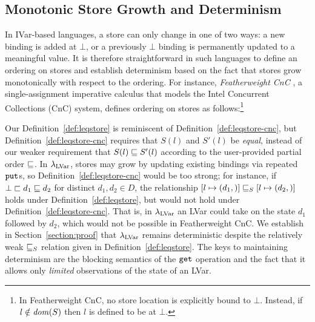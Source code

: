 
\subsection{Monotonic Store Growth and Determinism}\label{subsection:monotonicity}

In IVar-based languages, a store can only change
in one of two ways: a new binding is added at $\bot$, or a
previously $\bot$ binding is permanently updated to a meaningful value.
It is therefore straightforward in such languages
to define an ordering on stores and establish determinism based on the
fact that stores grow monotonically with respect to the ordering. For
instance, \emph{Featherweight CnC} \cite{CnC}, a single-assignment 
imperative calculus that models the Intel Concurrent Collections (CnC)
system, defines ordering on stores as follows:\footnote{In
  Featherweight CnC, 
  no store location is explicitly bound to $\bot$.
  Instead, if $l \notin \mathit{dom}(S)$ then $l$ is defined to be at
  $\bot$. %
}

\DefLeqStoreCnC

\noindent 
Our Definition~\ref{def:leqstore} is reminiscent of
Definition~\ref{def:leqstore-cnc}, but Definition~\ref{def:leqstore-cnc}
requires that $S(l)$ and $S'(l)$
be \emph{equal}, instead of our weaker
requirement that $S(l) \sqsubseteq S'(l)$ according to the user-provided
partial order $\sqsubseteq$.  In $\lambda_{\textrm{LVar}}$, stores may grow by updating
existing bindings via repeated $\mbox{\texttt{put}}$s, so
Definition~\ref{def:leqstore-cnc} would be too strong; for instance,
if $\bot \sqsubset d_1 \sqsubseteq d_2$ for distinct $d_1, d_2 \in D$, the relationship
$\left[ l \mapsto (d_1, \right)] \sqsubseteq_S \left[ l \mapsto (d_2, \right)]$
holds under Definition~\ref{def:leqstore}, but would not hold under
Definition~\ref{def:leqstore-cnc}.  That is, in $\lambda_{\textrm{LVar}}$ an LVar
could take on the state $d_1$ followed by $d_2$, which would not be
possible in Featherweight CnC.  We establish in
Section~\ref{section:proof} that $\lambda_{\textrm{LVar}}$ remains
deterministic despite the relatively weak $ \sqsubseteq_S $
relation given in Definition~\ref{def:leqstore}.  The keys to
maintaining determinism are the blocking semantics of the $\mbox{\texttt{get}}$
operation and the fact that it allows only \emph{limited} observations
of the state of an LVar.



